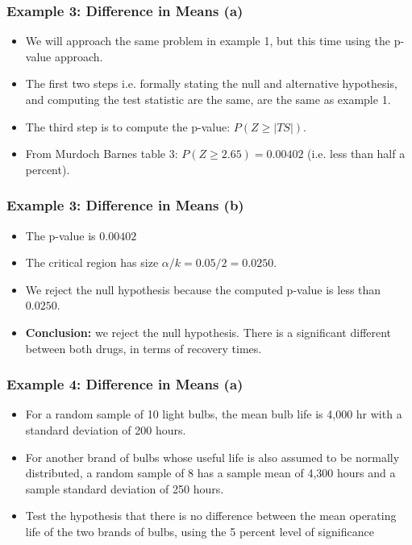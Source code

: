 \begin{frame}
\frametitle{Example 3: Difference in Means (a) }
\begin{itemize}
\item We will approach the same problem in example 1, but this time using the p-value approach.
\item The first two steps i.e. formally stating the null and alternative hypothesis, and computing the test statistic are the same, are the same as example 1.
\item The third step is to compute the p-value:  $P(Z \geq |TS|)$.
\item From Murdoch Barnes table 3: $P(Z \geq 2.65) = 0.00402$ (i.e. less than half a percent).

\end{itemize}
\end{frame}

\begin{frame}
\frametitle{Example 3: Difference in Means (b) }
\begin{itemize}
\item The p-value is  $0.00402$
\item The critical region has size $\alpha/k = 0.05/2 = 0.0250$.
\item We reject the null hypothesis because the computed p-value is less than $0.0250$.
\item \textbf{Conclusion:} we reject the null hypothesis. There is a significant different between both drugs, in terms of recovery times.
\end{itemize}
\end{frame}



\begin{frame}
\frametitle{Example 4: Difference in Means (a) }
\begin{itemize}
\item For a random sample of 10 light bulbs, the mean bulb life is 4,000 hr with a standard deviation of 200 hours.
\item For another brand of bulbs whose useful life is also assumed to be normally distributed, a random sample of 8 has a sample mean of 4,300 hours
and a sample standard deviation of 250 hours. \item Test the hypothesis that there is no difference between the
mean operating life of the two brands of bulbs, using the 5 percent level of significance
\end{itemize}
\end{frame}

